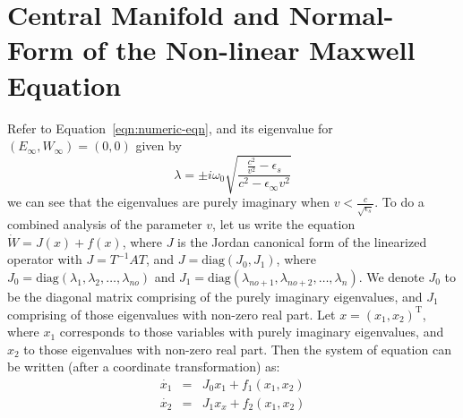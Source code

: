 \documentclass{article}[12pt]
\theoremstyle{plain}
\begin{document}

\section{Central Manifold and Normal-Form of the Non-linear Maxwell Equation}
\label{sec:nl-maxwell-central-manifold}
Refer to Equation~\ref{eqn:numeric-eqn}, and its eigenvalue for $(E_\infty,W_\infty)=(0,0)$ given by 
\[
\lambda = \pm i \omega_0 \sqrt{ \frac{ \frac{c^2}{v^2} -\epsilon_s }
{c^2-\epsilon_\infty v^2}}
\]
we can see that the eigenvalues are purely imaginary when $v<\frac{c}{\sqrt{\epsilon_s}}$. To do a combined analysis of the parameter $v$, let
us write the equation $\dot{W}=J(x)+f(x)$, where $J$ is the Jordan canonical form of the linearized operator with $J=T^{-1}AT$, and
$J=\mathrm{diag}(J_0,J_1)$, where $J_0=\mathrm{diag}(\lambda_1,\lambda_2,\ldots,\lambda_{no})$
and $J_1=\mathrm{diag}(\lambda_{no+1},\lambda_{no+2},\ldots,\lambda_n)$. We denote $J_0$ to be the diagonal matrix
comprising of the purely imaginary eigenvalues, and $J_1$ comprising of those eigenvalues with non-zero real part.
Let $x=(x_1,x_2)^\mathrm{T}$, where $x_1$ corresponds to those variables with purely imaginary eigenvalues, and $x_2$
to those eigenvalues with non-zero real part. Then the system of equation can be written (after a coordinate transformation) as:
\begin{eqnarray}
\dot{x_1} & = & J_0 x_1 + f_1(x_1,x_2) \nonumber \\
\dot{x_2} & = & J_1 x_x + f_2(x_1,x_2) \nonumber 
\end{eqnarray}
\end{document}
